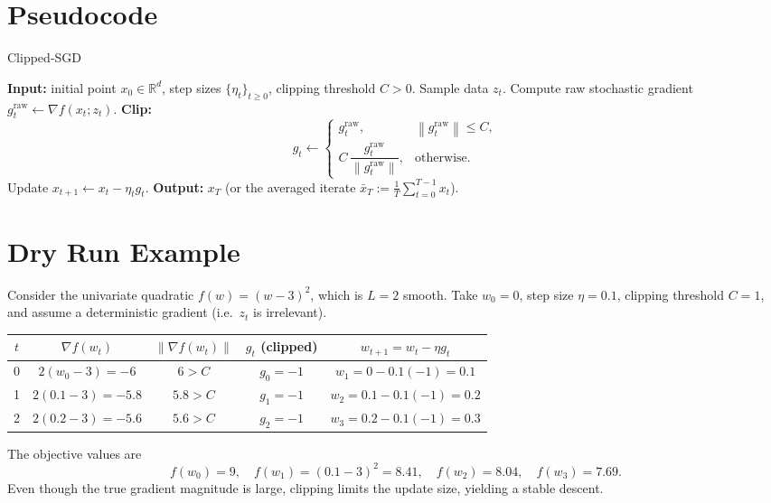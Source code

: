 \documentclass{article}
\newcommand{\R}{\mathbb{R}}
\newcommand{\norm}[1]{\left\lVert#1\right\rVert}
\begin{document}
\section*{Pseudocode}
\begin{algorithm}[H]
\caption{Clipped‑SGD}
\begin{algorithmic}[1]
\State \textbf{Input:} initial point $x_0\in\R^d$, step sizes $\{\eta_t\}_{t\ge0}$, clipping threshold $C>0$.
    \State Sample data $z_t$.
    \State Compute raw stochastic gradient $g^{\text{raw}}_t \gets \nabla f(x_t;z_t)$.
    \State \textbf{Clip:}
    \[
    g_t \gets 
    \begin{cases}
    g^{\text{raw}}_t, & \norm{g^{\text{raw}}_t}\le C,\\
    C\,\dfrac{g^{\text{raw}}_t}{\norm{g^{\text{raw}}_t}}, & \text{otherwise}.
    \end{cases}
    \]
    \State Update $x_{t+1} \gets x_t - \eta_t g_t$.
\EndFor
\State \textbf{Output:} $x_T$ (or the averaged iterate $\bar x_T:=\frac1T\sum_{t=0}^{T-1}x_t$).
\end{algorithmic}
\end{algorithm}

\section*{Dry Run Example}
Consider the univariate quadratic $f(w)=(w-3)^2$, which is $L=2$ smooth.
Take $w_0=0$, step size $\eta=0.1$, clipping threshold $C=1$, and assume a
deterministic gradient (i.e.\ $z_t$ is irrelevant).

\begin{center}
\begin{tabular}{c|c|c|c|c}
$t$ & $\nabla f(w_t)$ & $\norm{\nabla f(w_t)}$ & $g_t$ (clipped) & $w_{t+1}=w_t-\eta g_t$\\ \hline
0 & $2(w_0-3)=-6$ & $6>C$ & $g_0=-1$ & $w_1=0-0.1(-1)=0.1$\\
1 & $2(0.1-3)=-5.8$ & $5.8>C$ & $g_1=-1$ & $w_2=0.1-0.1(-1)=0.2$\\
2 & $2(0.2-3)=-5.6$ & $5.6>C$ & $g_2=-1$ & $w_3=0.2-0.1(-1)=0.3$
\end{tabular}
\end{center}

The objective values are
\[
f(w_0)=9,\quad f(w_1)=(0.1-3)^2=8.41,\quad
f(w_2)=8.04,\quad f(w_3)=7.69.
\]
Even though the true gradient magnitude is large, clipping limits the update
size, yielding a stable descent.
\end{document}
